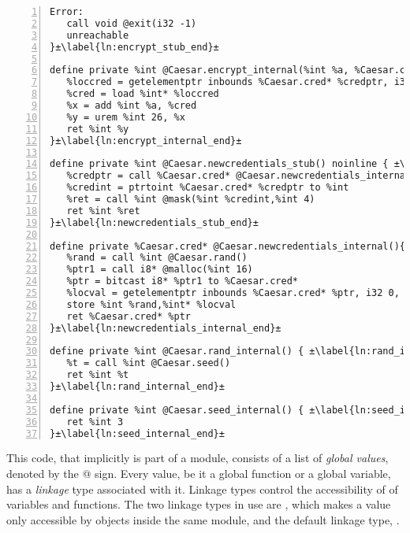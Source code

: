 \begin{lstlisting}[frame=single,numbers=left, language={[x86masm]Assembler}, caption={[LLVM Translation Caesar Cipher Example]LLVM IR for the example.},
label=llvm:Example]
   Error:
   call void @exit(i32 -1)
   unreachable
}±\label{ln:encrypt_stub_end}±

define private %int @Caesar.encrypt_internal(%int %a, %Caesar.cred* %credptr) {±\label{ln:encrypt_internal_start}±
   %loccred = getelementptr inbounds %Caesar.cred* %credptr, i32 0, i32 0
   %cred = load %int* %loccred
   %x = add %int %a, %cred
   %y = urem %int 26, %x
   ret %int %y
}±\label{ln:encrypt_internal_end}±

define private %int @Caesar.newcredentials_stub() noinline { ±\label{ln:newcredentials_stub_start}±
   %credptr = call %Caesar.cred* @Caesar.newcredentials_internal() ±\label{ln:newcredentialscall}±
   %credint = ptrtoint %Caesar.cred* %credptr to %int
   %ret = call %int @mask(%int %credint,%int 4)
   ret %int %ret
}±\label{ln:newcredentials_stub_end}±

define private %Caesar.cred* @Caesar.newcredentials_internal(){±\label{ln:newcredentials_internal_start}±
   %rand = call %int @Caesar.rand()
   %ptr1 = call i8* @malloc(%int 16)
   %ptr = bitcast i8* %ptr1 to %Caesar.cred*
   %locval = getelementptr inbounds %Caesar.cred* %ptr, i32 0, i32 0
   store %int %rand,%int* %locval
   ret %Caesar.cred* %ptr
}±\label{ln:newcredentials_internal_end}±

define private %int @Caesar.rand_internal() { ±\label{ln:rand_internal_start}±
   %t = call %int @Caesar.seed()
   ret %int %t
}±\label{ln:rand_internal_end}±

define private %int @Caesar.seed_internal() { ±\label{ln:seed_internal_start}±
   ret %int 3
}±\label{ln:seed_internal_end}±
\end{lstlisting}

This code, that implicitly is part of a module, consists of a list of \emph{global values}, denoted by the @ sign.
Every value, be it a global function or a global variable, has a \emph{linkage} type associated with it.
Linkage types control the accessibility of of variables and functions. The two linkage types in use are , which makes a value only accessible by objects inside the same module, and the default linkage type, .

